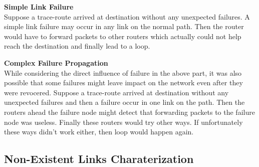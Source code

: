 \documentclass[conference, twocolumn, oneside, 10pt]{IEEEtran}
\begin{document}
\textbf{Simple Link Failure}\\

Suppose a trace-route arrived at destination without any unexpected failures. A simple link failure may occur in any link on the normal path. Then the router would have to forward packets to other routers which actually could not help reach the destination and finally lead to a loop.



\textbf{Complex Failure Propagation}\\

While considering the direct influence of failure in the above part, it was also possible that some failures might leave impact on the network even after they were revocered. Suppose a trace-route arrived at destination without any unexpected failures and then a failure occur in one link on the path. Then the routers ahead the failure node might detect that forwarding packets to the failure node was useless. Finally these routers would try other ways. If unfortunately these ways didn't work either, then loop would happen again.    


\subsection{Non-Existent Links Charaterization}
\end{document}
